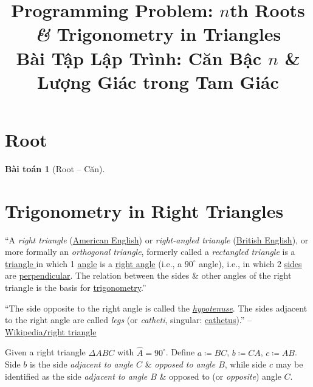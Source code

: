 \documentclass{article}
\title{Programming Problem: $n$th Roots {\it\&} Trigonometry in Triangles\\Bài Tập Lập Trình: Căn Bậc $n$ \& Lượng Giác trong Tam Giác}
\date{}
\newtheorem{baitoan}{Bài toán}
\begin{document}
\maketitle
\vspace{-2cm}


\section{Root}

\begin{baitoan}[Root -- Căn]
	
\end{baitoan}


\section{Trigonometry in Right Triangles}
``A \textit{right triangle} (\href{https://en.wikipedia.org/wiki/American_English}{American English}) or \textit{right-angled triangle} (\href{https://en.wikipedia.org/wiki/British_English}{British English}), or more formally an \textit{orthogonal triangle}, formerly called a \textit{rectangled triangle} is a \href{https://en.wikipedia.org/wiki/Triangle}{triangle } in which 1 \href{https://en.wikipedia.org/wiki/Angle}{angle} is a \href{https://en.wikipedia.org/wiki/Right_angle}{right angle} (i.e., a $90^\circ$ angle), i.e., in which 2 \href{https://en.wikipedia.org/wiki/Polygon_side}{sides} are \href{https://en.wikipedia.org/wiki/Perpendicular}{perpendicular}. The relation between the sides \& other angles of the right triangle is the basis for \href{https://en.wikipedia.org/wiki/Trigonometry}{trigonometry}.''

``The side opposite to the right angle is called the \href{https://en.wikipedia.org/wiki/Hypotenuse}{\textit{hypotenuse}}. The sides adjacent to the right angle are called \textit{legs} (or \textit{catheti}, singular: \href{https://en.wikipedia.org/wiki/Cathetus}{cathetus}).'' -- \href{https://en.wikipedia.org/wiki/Right_triangle}{Wikipedia{\tt/}right triangle}

Given a right triangle $\Delta ABC$ with $\widehat A = 90^\circ$. Define $a\coloneqq BC$, $b\coloneqq CA$, $c\coloneqq AB$. Side $b$ is the side \textit{adjacent to angle $C$} \& \textit{opposed to angle $B$}, while side $c$ may be identified as the side \textit{adjacent to angle $B$} \& opposed to (or \textit{opposite}) angle $C$.
\end{document}
